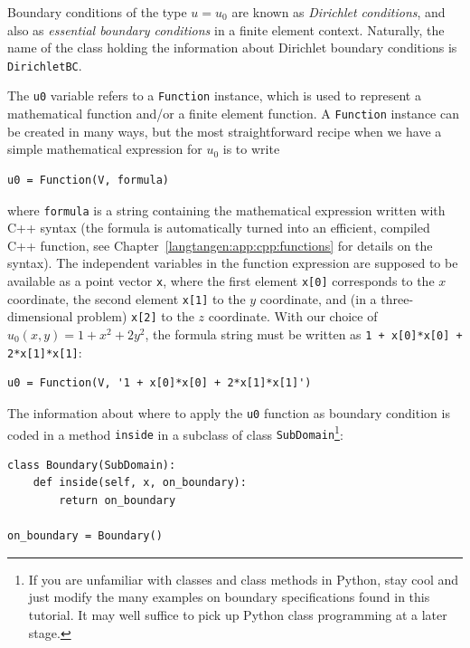 Boundary conditions
of the type $u=u_0$ are known as \emph{Dirichlet conditions}, and also
as \emph{essential boundary conditions} in a finite element context.
Naturally, the name of the \dolfin{} class holding the information about
Dirichlet boundary conditions is {\fontsize{12pt}{12pt}\texttt{DirichletBC}}.

The {\fontsize{12pt}{12pt}\verb!u0!} variable refers to a {\fontsize{12pt}{12pt}\verb!Function!} instance, which
is used to represent a mathematical function and/or a finite element
function.
A {\fontsize{12pt}{12pt}\texttt{Function}} instance
can be created in many ways, but the most straightforward recipe when
we have a simple mathematical expression for $u_0$ is to write
\begin{Verbatim}[fontsize=\fontsize{10pt}{10pt},tabsize=8,baselinestretch=1.05,
fontfamily=tt,xleftmargin=7mm]
u0 = Function(V, formula)
\end{Verbatim}
\noindent
where {\fontsize{12pt}{12pt}\verb!formula!} is a string containing the mathematical expression
written with C++ syntax (the formula is
automatically turned into an efficient, compiled
C++ function, see Chapter~\ref{langtangen:app:cpp:functions} for
details on the syntax). The independent variables in the function
expression are supposed to be available
as a point vector {\fontsize{12pt}{12pt}\verb!x!}, where the first element {\fontsize{12pt}{12pt}\verb!x[0]!}
corresponds to the $x$ coordinate, the second element {\fontsize{12pt}{12pt}\verb!x[1]!}
to the $y$ coordinate, and (in a three-dimensional problem)
{\fontsize{12pt}{12pt}\verb!x[2]!} to the $z$ coordinate. With our choice of
$u_0(x,y)=1 + x^2 + 2y^2$, the formula string must be written
as {\fontsize{12pt}{12pt}\verb!1 + x[0]*x[0] + 2*x[1]*x[1]!}:
\begin{Verbatim}[fontsize=\fontsize{10pt}{10pt},tabsize=8,baselinestretch=1.05,
fontfamily=tt,xleftmargin=7mm]
u0 = Function(V, '1 + x[0]*x[0] + 2*x[1]*x[1]')
\end{Verbatim}
\noindent
The information about where to apply the {\fontsize{12pt}{12pt}\verb!u0!} function as
boundary condition is coded in a method {\fontsize{12pt}{12pt}\verb!inside!}
in a subclass of class {\fontsize{12pt}{12pt}\verb!SubDomain!}\footnote{If you are unfamiliar with
classes and class methods in Python, stay cool and just modify the
many examples on boundary specifications found in this tutorial.
It may well suffice to pick up Python class programming at a later stage.}:
\begin{Verbatim}[fontsize=\fontsize{10pt}{10pt},tabsize=8,baselinestretch=1.05,
fontfamily=tt,xleftmargin=7mm]
class Boundary(SubDomain):
    def inside(self, x, on_boundary):
        return on_boundary

on_boundary = Boundary()
\end{Verbatim}

